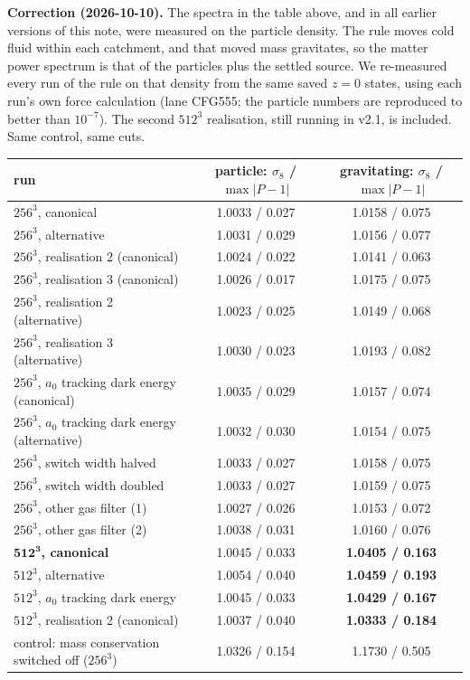 \documentclass[10pt]{article}
\begin{document}
\textbf{Correction (2026-10-10).} The spectra in the table above, and in all earlier versions of this note, were measured on the particle density. The rule moves cold fluid within each catchment, and that moved mass gravitates, so the matter power spectrum is that of the particles plus the settled source. We re-measured every run of the rule on that density from the same saved $z=0$ states, using each run's own force calculation (lane CFG555; the particle numbers are reproduced to better than $10^{-7}$). The second $512^3$ realisation, still running in v2.1, is included. Same control, same cuts.
\begin{center}
\begin{tabular}{lcc}
\toprule
run & particle: $\sigma_8$ / $\max|P-1|$ & gravitating: $\sigma_8$ / $\max|P-1|$\\
\midrule
$256^3$, canonical & 1.0033 / 0.027 & 1.0158 / 0.075\\
$256^3$, alternative & 1.0031 / 0.029 & 1.0156 / 0.077\\
$256^3$, realisation 2 (canonical) & 1.0024 / 0.022 & 1.0141 / 0.063\\
$256^3$, realisation 3 (canonical) & 1.0026 / 0.017 & 1.0175 / 0.075\\
$256^3$, realisation 2 (alternative) & 1.0023 / 0.025 & 1.0149 / 0.068\\
$256^3$, realisation 3 (alternative) & 1.0030 / 0.023 & 1.0193 / 0.082\\
$256^3$, $a_0$ tracking dark energy (canonical) & 1.0035 / 0.029 & 1.0157 / 0.074\\
$256^3$, $a_0$ tracking dark energy (alternative) & 1.0032 / 0.030 & 1.0154 / 0.075\\
$256^3$, switch width halved & 1.0033 / 0.027 & 1.0158 / 0.075\\
$256^3$, switch width doubled & 1.0033 / 0.027 & 1.0159 / 0.075\\
$256^3$, other gas filter (1) & 1.0027 / 0.026 & 1.0153 / 0.072\\
$256^3$, other gas filter (2) & 1.0038 / 0.031 & 1.0160 / 0.076\\
$\mathbf{512^3}$\textbf{, canonical} & 1.0045 / 0.033 & \textbf{1.0405 / 0.163}\\
$512^3$, alternative & 1.0054 / 0.040 & \textbf{1.0459 / 0.193}\\
$512^3$, $a_0$ tracking dark energy & 1.0045 / 0.033 & \textbf{1.0429 / 0.167}\\
$512^3$, realisation 2 (canonical) & 1.0037 / 0.040 & \textbf{1.0333 / 0.184}\\
\midrule
control: mass conservation switched off ($256^3$) & 1.0326 / 0.154 & 1.1730 / 0.505\\
\bottomrule
\end{tabular}
\end{center}
\end{document}
